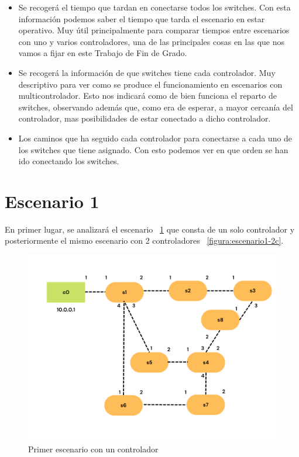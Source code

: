 \documentclass[a4paper, 12pt]{book}
\begin{document}
	
	\begin{itemize}
		\item Se recogerá el tiempo que tardan en conectarse todos los switches. Con esta información podemos saber el tiempo que tarda el escenario en estar operativo. Muy útil principalmente para comparar tiempos entre escenarios con uno y varios controladores, una de las principales cosas en las que nos vamos a fijar en este Trabajo de Fin de Grado.
		
		\item Se recogerá la información de que switches tiene cada controlador. Muy descriptivo para ver como se produce el funcionamiento en escenarios con multicontrolador. Esto nos indicará como de bien funciona el reparto de switches, observando además que, como era de esperar, a mayor cercanía del controlador, mas posibilidades de estar conectado a dicho controlador.
		
		\item Los caminos que ha seguido cada controlador para conectarse a cada uno de los switches que tiene asignado. Con esto podemos ver en que orden se han ido conectando los switches.
		
	\end{itemize}
 	
 	\clearpage
 	\section{Escenario 1}
 	En primer lugar, se analizará el escenario ~\ref{figura:escenario1-1c} que consta de un solo controlador y posteriormente el mismo escenario con 2 controladores ~\ref{figura:escenario1-2c}.%
 	
 	\vspace*{-18pt}
 	\begin{figure}[H]
 		\centering
 		\includegraphics[width=12cm, keepaspectratio]{img/escenario1-1}
 		\caption{Primer escenario con un controlador}
 		\label{figura:escenario1-1c}
 	\end{figure}
 	
\end{document}
